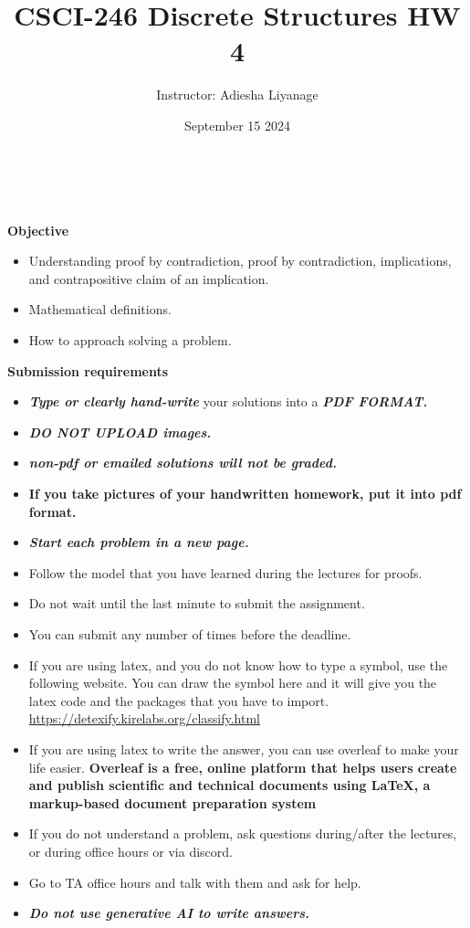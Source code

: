 \documentclass[12pt]{exam}
\title{CSCI-246 Discrete Structures HW 4}
\author{Instructor: Adiesha Liyanage}
\date{September 15 2024}
\begin{document}
\maketitle

\hrulefill
\\
\\
\textbf{Objective}
\begin{itemize}
    \item Understanding proof by contradiction, proof by contradiction, implications, and contrapositive claim of an implication.
    \item Mathematical definitions.
    \item How to approach solving a problem.
\end{itemize}

\textbf{Submission requirements}
\begin{itemize}
    \item \textbf{\textit{Type or clearly hand-write}} your solutions into a \textbf{\textit{PDF FORMAT.}} 
    \item \textbf{\textit{DO NOT UPLOAD images.}}
    \item \textbf{\textit{non-pdf or emailed solutions will not be graded.}}
    \item \textbf{If you take pictures of your handwritten homework, put it into pdf format.}
    \item \textbf{\textit{Start each problem in a new page.}}
    \item Follow the model that you have learned during the lectures for proofs.
    \item Do not wait until the last minute to submit the assignment.
    \item You can submit any number of times before the deadline. 
    \item If you are using latex, and you do not know how to type a symbol, use the following website. You can draw the symbol here and it will give you the latex code and the packages that you have to import. \url{https://detexify.kirelabs.org/classify.html}
    \item If you are using latex to write the answer, you can use overleaf to make your life easier. \textbf{Overleaf is a free, online platform that helps users create and publish scientific and technical documents using LaTeX, a markup-based document preparation system}
    \item If you do not understand a problem, ask questions during/after the lectures, or during office hours or via discord.
    \item Go to TA office hours and talk with them and ask for help.
    \item \textbf{\textit{Do not use generative AI to write answers.}} 
\end{itemize}
\end{document}
